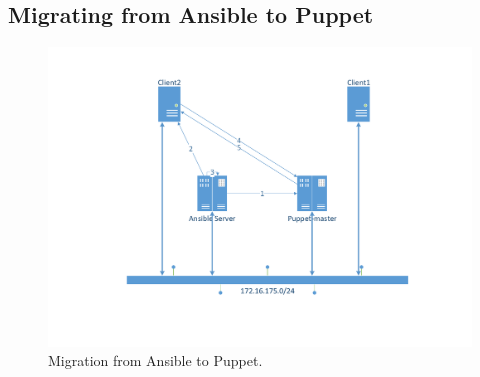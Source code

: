 \subsection{Migrating from Ansible to Puppet}\label{subsec:ansibletopuppet}

\begin{figure}[!hb]
        \includegraphics[scale=0.5]{img/AnsibletoPuppet.pdf}
        \caption{Migration from Ansible to Puppet.}
        \label{fig:situation2}
\end{figure}

\begin{lstlisting}
    
\end{lstlisting}

